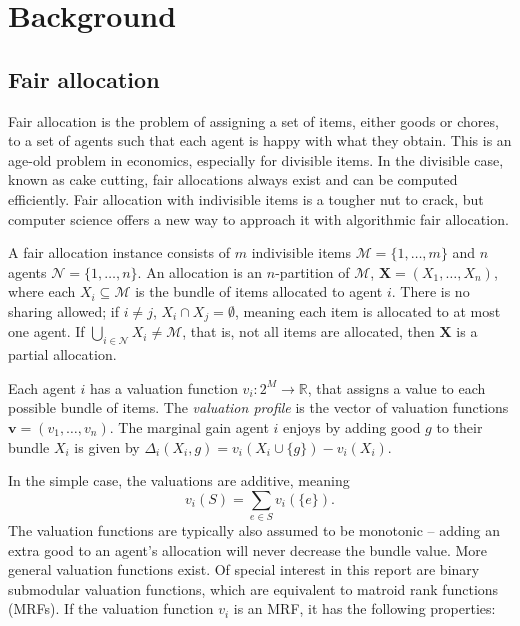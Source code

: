 \chapter{Background}\label{background}

\section{Fair allocation}
Fair allocation is the problem of assigning a set of items, either goods or chores, to a set of agents such that each agent is happy with what they obtain. This is an age-old problem in economics, especially for divisible items. In the divisible case, known as cake cutting, fair allocations always exist and can be computed efficiently. Fair allocation with indivisible items is a tougher nut to crack, but computer science offers a new way to approach it with algorithmic fair allocation.

A fair allocation instance consists of $m$ indivisible items $\mathcal{M} = \{1, \ldots ,m\}$ and $n$ agents $\mathcal{N} = \{1, \ldots ,n\}$. An allocation is an $n$-partition of $\mathcal{M}$, $\textbf{X} = (X_1, \ldots, X_n)$, where each $X_i \subseteq \mathcal{M}$ is the bundle of items allocated to agent $i$. There is no sharing allowed; if $i \not = j$, $X_i \cap X_j = \emptyset$, meaning each item is allocated to at most one agent. If $\bigcup_{i \in \mathcal{N} } X_i  \not =  \mathcal{M}$, that is, not all items are allocated, then $\textbf{X}$ is a partial allocation.

Each agent $i$ has a valuation function $v_i: 2^M \rightarrow \mathbb{R}$, that assigns a value to each possible bundle of items. The \textit{valuation profile} is the vector of valuation functions $\mathbf{v} = (v_1, \ldots, v_n)$. The marginal gain agent $i$ enjoys by adding good $g$ to their bundle $X_i$ is given by $\Delta_i(X_i, g) = v_i(X_i \cup \{g\}) - v_i(X_i)$.

In the simple case, the valuations are additive, meaning \[v_i(S) = \sum_{e \in S} v_i(\{e\}).\] The valuation functions are typically also assumed to be monotonic – adding an extra good to an agent's allocation will never decrease the bundle value. More general valuation functions exist. Of special interest in this report are binary submodular valuation functions, which are equivalent to matroid rank functions (MRFs). If the valuation function $v_i$ is an MRF, it has the following properties:

